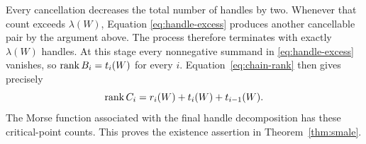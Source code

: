Every cancellation decreases the total number of handles by two.
Whenever that count exceeds $\lambda(W)$, Equation
\eqref{eq:handle-excess} produces another cancellable pair by the
argument above.  The process therefore terminates with exactly
$\lambda(W)$ handles.  At this stage every nonnegative summand in
\eqref{eq:handle-excess} vanishes, so $\operatorname{rank} B_i=t_i(W)$ for every $i$.
Equation~\eqref{eq:chain-rank} then gives precisely
\[
 \operatorname{rank} C_i=r_i(W)+t_i(W)+t_{i-1}(W).
\]
The Morse function associated with the final handle decomposition has
these critical-point counts.  This proves the existence assertion in
Theorem~\ref{thm:smale}.
